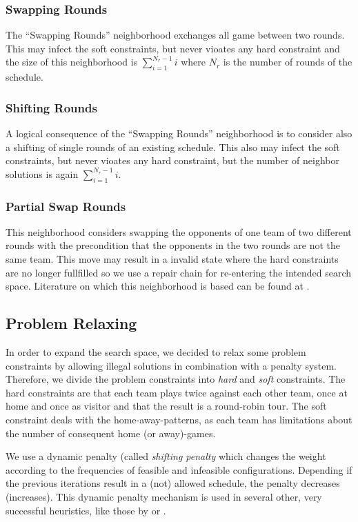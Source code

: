 \documentclass[a4paper,11pt]{article}
\begin{document}
\subsubsection{Swapping Rounds}
The ``Swapping Rounds'' neighborhood exchanges all game between two rounds. This may infect the soft constraints, but never vioates any hard constraint and the 
size of this neighborhood is $\sum_{i=1}^{N_r-1}i$ where $N_r$ is the number of rounds of the schedule.

\subsubsection{Shifting Rounds}
A logical consequence of the ``Swapping Rounds'' neighborhood is to consider also a shifting of single rounds of an existing schedule. 
This also may infect the soft constraints, but never vioates any hard constraint, but the number of neighbor solutions is again $\sum_{i=1}^{N_r-1}i$.

\subsubsection{Partial Swap Rounds}
This neighborhood considers swapping the opponents of one team of two different rounds with the precondition that the opponents in the 
two rounds are not the same team. This move may result in a invalid state where the hard constraints are no longer fullfilled so we use a 
repair chain for re-entering the intended search space. Literature on which this neighborhood is based can be found at \cite{Gaspero07,HentenryckV06, Chen_anant}.

\subsection{Problem Relaxing}
In order to expand the search space, we decided to relax some problem constraints by allowing illegal solutions in combination with a penalty system.
Therefore, we divide the problem constraints into \emph{hard} and \emph{soft} constraints. The hard constraints are that each team plays twice against 
each other team, once at home and once as visitor and that the result is a round-robin tour. 
The soft constraint deals with the home-away-patterns, as each team has limitations about the number of consequent home (or away)-games.

We use a dynamic penalty (called \emph{shifting penalty} which changes the weight according to the frequencies of feasible and infeasible configurations.
 Depending if the previous iterations result in a (not) allowed schedule, the penalty decreases (increases). 
This dynamic penalty mechanism is used in several other, very successful heuristics, like those by \cite{Anagnostopoulos06} or \cite{Gaspero07}.
\end{document}
